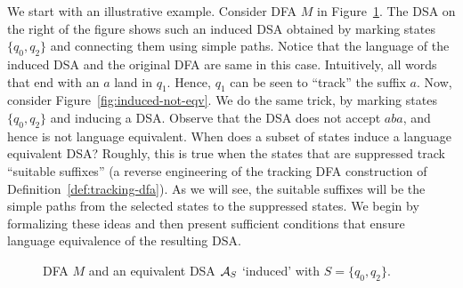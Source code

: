 We start with an illustrative example. Consider DFA $M$ in
Figure~\ref{fig:induced-eqv}. 
The DSA on the right of the figure shows such an induced DSA obtained
by marking states $\{q_0, q_2\}$ and connecting them using simple
paths. Notice that the language of the induced DSA and the original
DFA are same in this case. Intuitively, all words that end with an $a$
land in $q_1$. Hence, $q_1$ can be seen to ``track'' the suffix $a$.
Now, consider Figure~\ref{fig:induced-not-eqv}. We do the same trick,
by marking states $\{q_0, q_2\}$ and inducing a DSA. Observe that the
DSA does not accept $aba$, and hence is not language equivalent.  When
does a subset of states induce a language equivalent DSA? Roughly,
this is true when the states that are suppressed track ``suitable
suffixes'' (a reverse engineering of the tracking DFA construction of
Definition~\ref{def:tracking-dfa}). As we will see, the suitable
suffixes will be the simple paths from the selected states to the
suppressed states. We begin by formalizing these ideas and then
present sufficient conditions that ensure language equivalence of the
resulting DSA.

\begin{figure}[t]
  \centering
  \caption{DFA $M$ and an equivalent DSA $\mathcal{A}_S$ `induced' with
    $S = \{q_0, q_2\}$.}
  \label{fig:induced-eqv}
\end{figure}


